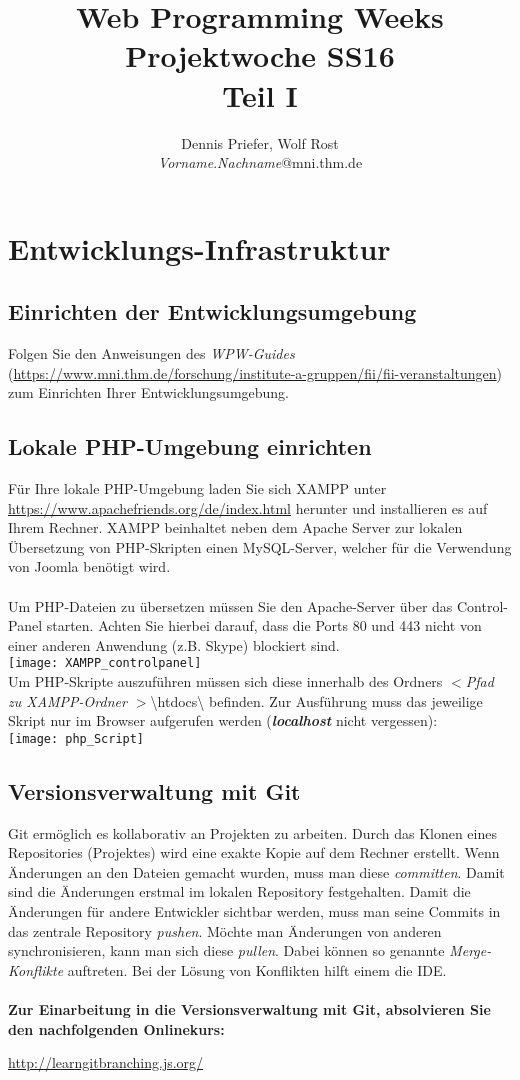 \documentclass[]{article}
\title{Web Programming Weeks Projektwoche SS16\\Teil I}
\author{Dennis Priefer, Wolf Rost\\\textit{Vorname}.\textit{Nachname}@mni.thm.de}
\begin{document}
\maketitle

\section{Entwicklungs-Infrastruktur}
\subsection{Einrichten der Entwicklungsumgebung}
Folgen Sie den Anweisungen des \textit{WPW-Guides} (\url{https://www.mni.thm.de/forschung/institute-a-gruppen/fii/fii-veranstaltungen}) zum Einrichten Ihrer Entwicklungsumgebung.
\subsection{Lokale PHP-Umgebung einrichten}
Für Ihre lokale PHP-Umgebung laden Sie sich XAMPP unter \url{https://www.apachefriends.org/de/index.html} herunter und installieren es auf Ihrem Rechner. XAMPP beinhaltet neben dem Apache Server zur lokalen Übersetzung von PHP-Skripten einen MySQL-Server, welcher für die Verwendung von Joomla benötigt wird.\\
\\
Um PHP-Dateien zu übersetzen müssen Sie den Apache-Server über das Control-Panel starten. Achten Sie hierbei darauf, dass die Ports 80 und 443 nicht von einer anderen Anwendung (z.B. Skype) blockiert sind.\\
\texttt{[image: XAMPP\_controlpanel]}\\
Um PHP-Skripte auszuführen müssen sich diese innerhalb des Ordners \textit{$<$Pfad zu XAMPP-Ordner $>$}\textbackslash{}htdocs\textbackslash{} befinden. Zur Ausführung muss das jeweilige Skript nur im Browser aufgerufen werden (\textbf{\textit{localhost}} nicht vergessen):\\
\texttt{[image: php\_Script]}

\subsection{Versionsverwaltung mit Git}
Git ermöglich es kollaborativ an Projekten zu arbeiten.
Durch das Klonen eines Repositories (Projektes) wird eine exakte Kopie auf dem Rechner erstellt. Wenn Änderungen an den Dateien gemacht wurden, muss man diese \textit{committen}. Damit sind die Änderungen erstmal im lokalen Repository festgehalten. Damit die Änderungen für andere Entwickler sichtbar werden, muss man seine Commits in das zentrale Repository \textit{pushen}. Möchte man Änderungen von anderen synchronisieren, kann man sich diese \textit{pullen}. Dabei können so genannte \textit{Merge-Konflikte} auftreten. Bei der Lösung von Konflikten hilft einem die IDE.\\\\
\textbf{Zur Einarbeitung in die Versionsverwaltung mit Git, absolvieren Sie den nachfolgenden Onlinekurs:}
\begin{list}{}{}
\item \url{http://learngitbranching.js.org/}
\end{list}
\end{document}
